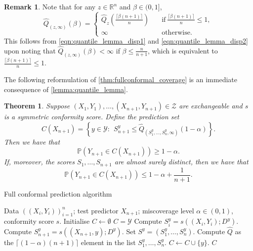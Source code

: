 \documentclass[11pt, titlepage]{article} %
\newcommand{\R}{\mathrm}
\newcommand{\Prob}[1]{\mathbb{P}\left( #1 \right)}
\numberwithin{equation}{section}
\newtheorem{theorem}{Theorem}
\theoremstyle{definition}
\newtheorem{remark}{Remark}
\numberwithin{theorem}{section}
\numberwithin{lemma}{section}
\numberwithin{corollary}{section}
\numberwithin{proposition}{section}
\numberwithin{definition}{section}
\numberwithin{remark}{section}
\begin{document}
\begin{remark}
    Note that for any \(z \in \mathbb{R}^n\) and \(\beta \in (0,1]\), \[\hat{Q}_{(z,\infty)} (\beta) = \begin{cases}
        \hat{Q}_z\left( \frac{\lceil \beta (n+1) \rceil }{n} \right) \quad &\R{if} \ \frac{\lceil \beta(n+1) \rceil}{n} \leq 1, \\
        \infty \quad &\R{otherwise}.
        \end{cases}\] This follows from \eqref{eqn:quantile_lemma_disp1} and \eqref{eqn:quantile_lemma_disp2} upon noting that \(\hat{Q}_{(z,\infty)}(\beta) < \infty\) if \(\beta \leq \frac{n}{n+1}\), which is equivalent to \(\frac{\lceil \beta (n+1) \rceil}{n} \leq 1\).
\end{remark}

\noindent The following reformulation of \cref{thm:fullconformal_coverage} is an immediate consequence of \cref{lemma:quantile_lemma}.

\begin{theorem}
    Suppose \((X_1, Y_1), \ldots, (X_{n+1}, Y_{n+1}) \in \mathcal{Z}\) are exchangeable and \(s\) is a symmetric conformity score. Define the prediction set \begin{equation}
        C(X_{n+1}) = \left\{ y \in \mathcal{Y}: \ \ S_{n+1}^y \leq \hat{Q}_{(S_1^y, \ldots, S_n^y, \infty)}(1-\alpha)  \right\}.
    \label{eqn:fullconformal_prediction_set_v2}
    \end{equation} Then we have that \[\Prob{Y_{n+1} \in C(X_{n+1})} \geq 1-\alpha.\] If, moreover, the scores \(S_1, \ldots, S_{n+1}\) are almost surely distinct, then we have that \[\Prob{Y_{n+1} \in C(X_{n+1})} \leq 1-\alpha + \frac{1}{n+1}.\]

\label{thm:fullconformal_coverage_v2}  
\end{theorem}



\begin{algorithm}[H]
\caption{Full conformal prediction algorithm}
\label{alg:fullconformal}
\begin{algorithmic}
    \Require Data \(((X_i, Y_i))_{i=1}^n\); test predictor \(X_{n+1}\); miscoverage level \(\alpha \in (0,1)\), conformity score \(s\).
    \State Initialise \(C \gets \emptyset\)
        \State \(C = \mathcal{Y}\)
    \Else
            \State Compute \(S_i^y = s((X_i, Y_i); D^y)\).
            \State Compute \(S_{n+1}^y = s((X_{n+1}, y); D^y)\).
            \State Set \(S^y = (S_1^y, \ldots, S_{n}^y)\).
            \State Compute \(\hat{Q}\) as the \(\lceil (1-\alpha)(n+1) \rceil \) element in the list \(S_1^y, \ldots, S_{n}^y\).
                \State \(C \gets C \cup \{y\} \).
            \EndIf      
        \EndFor
    \EndIf
    \Ensure \(C\)
\end{algorithmic}
\end{algorithm}
\end{document}

